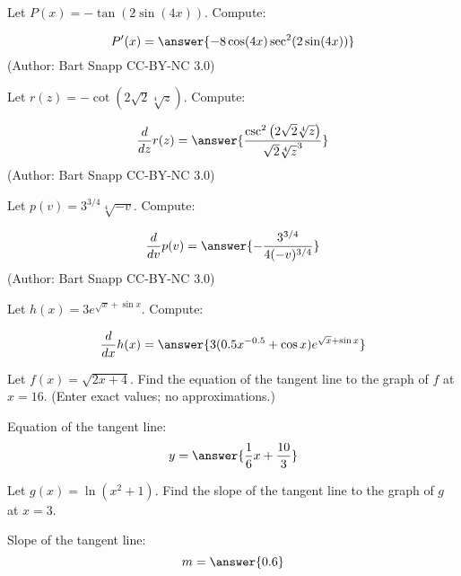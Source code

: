 \documentclass{ximera}
\begin{document}
 \begin{problem}\label{prob:240hom4prob13}
Let $P(x) = -\tan (2 \sin (4 x))$. Compute:

\[
P'(x)
=\answer{-8 \cos (4 x) \sec ^2(2 \sin (4 x))}
\]
(Author: Bart Snapp CC-BY-NC 3.0)
 \end{problem}
 
 \begin{problem}\label{prob:240hom4prob14}
Let $r(z) = -\cot \left(2 \sqrt{2} \sqrt[4]{z}\right)$. Compute:

\[
\frac{d}{dz}r(z)
=\answer{\frac{\csc ^2\left(2 \sqrt{2} \sqrt[4]{z}\right)}{\sqrt{2} \sqrt[4]{z}^3}}
\]
(Author: Bart Snapp CC-BY-NC 3.0)
 \end{problem}
 
 \begin{problem}\label{prob:240hom4prob15}
Let $p(v) = 3^{3/4} \sqrt[4]{-v}$. Compute:

\[
\frac{d}{dv}p(v)
=\answer{-\frac{3^{3/4}}{4 (-v)^{3/4}}}
\]
(Author: Bart Snapp CC-BY-NC 3.0)
 \end{problem}
 
  \begin{problem}\label{prob:240hom4prob16}
Let $h(x) = 3e^{\sqrt{x}+\sin x}$. Compute:

\[
\frac{d}{dx}h(x)
=\answer{3(0.5x^{-0.5}+\cos x)e^{\sqrt{x}+\sin x}}
\]

 \end{problem}
 
 \begin{problem}\label{prob:240hom4prob17}
Let $f(x)=\sqrt{2x+4}$.  Find the equation of the tangent line to the graph of $f$ at $x=16$.  (Enter exact values; no approximations.)

Equation of the tangent line:
$$y=\answer{\frac{1}{6}x+\frac{10}{3}}$$

 \end{problem}
 
 \begin{problem}\label{prob:240hom4prob18}
Let $g(x)=\ln{(x^2+1)}$.  Find the slope of the tangent line to the graph of $g$ at $x=3$.  

Slope of the tangent line:
$$m=\answer{0.6}$$

 \end{problem}
 
 
\end{document}
